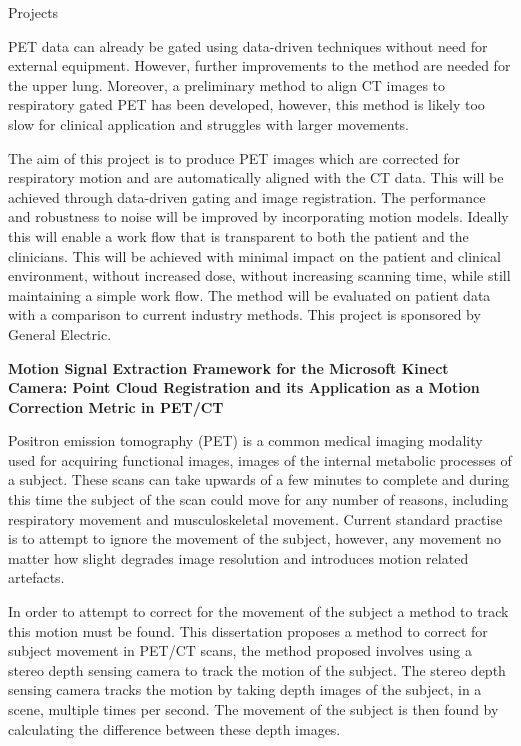 \documentclass{cv}
\begin{document}
\begin{rSection}{Projects}
\item PET data can already be gated using data-driven techniques without need for external equipment. However, further improvements to the method are needed for the upper lung. Moreover, a preliminary method to align CT images to respiratory gated PET has been developed, however, this method is likely too slow for clinical application and struggles with larger movements.

\item The aim of this project is to produce PET images which are corrected for respiratory motion and are automatically aligned with the CT data. This will be achieved through data-driven gating and image registration. The performance and robustness to noise will be improved by incorporating motion models. Ideally this will enable a work flow that is transparent to both the patient and the clinicians. This will be achieved with minimal impact on the patient and clinical environment, without increased dose, without increasing scanning time, while still maintaining a simple work flow. The method will be evaluated on patient data with a comparison to current industry methods. This project is sponsored by General Electric.


{\bf Motion Signal Extraction Framework for the Microsoft Kinect Camera: Point Cloud Registration and its Application as a Motion Correction Metric in PET/CT} \hfill {\em} 

\item Positron emission tomography (PET) is a common medical imaging modality used for acquiring functional images, images of the internal metabolic processes of a subject. These scans can take upwards of a few minutes to complete and during this time the subject of the scan could move for any number of reasons, including respiratory movement and musculoskeletal movement. Current standard practise is to attempt to ignore the movement of the subject, however, any movement no matter how slight degrades image resolution and introduces motion related artefacts.

\item In order to attempt to correct for the movement of the subject a method to track this motion must be found. This dissertation proposes a method to correct for subject movement in PET/CT scans, the method proposed involves using a stereo depth sensing camera to track the motion of the subject. The stereo depth sensing camera tracks the motion by taking depth images of the subject, in a scene, multiple times per second. The movement of the subject is then found by calculating the difference between these depth images.


\end{rSection}
\end{document}
